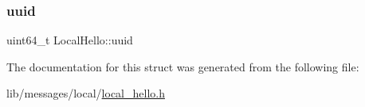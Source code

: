 \mbox{\label{structLocalHello_a2793976cc1bea077237bb17c2dbb1713}} 
\subsubsection{\texorpdfstring{uuid}{uuid}}
{\footnotesize\ttfamily uint64\+\_\+t Local\+Hello\+::uuid}



The documentation for this struct was generated from the following file\+:\begin{DoxyCompactItemize}
\item 
lib/messages/local/\hyperlink{local__hello_8h}{local\+\_\+hello.\+h}\end{DoxyCompactItemize}

